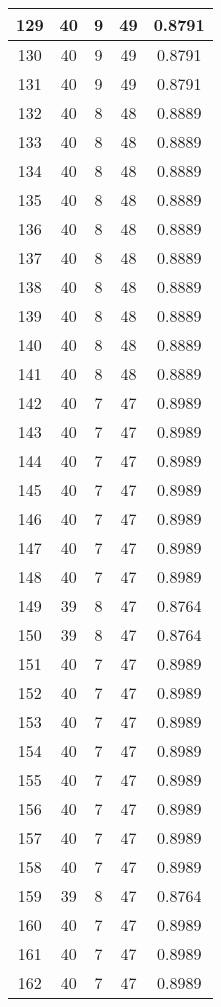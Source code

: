 \documentclass[letterpaper, 12pt]{article}
\begin{document}
\begin{longtable}{|c|c|c|c|c|}
\hline
129 & 40 & 9 & 49 & 0.8791 \\
\hline
130 & 40 & 9 & 49 & 0.8791 \\
\hline
131 & 40 & 9 & 49 & 0.8791 \\
\hline
132 & 40 & 8 & 48 & 0.8889 \\
\hline
133 & 40 & 8 & 48 & 0.8889 \\
\hline
134 & 40 & 8 & 48 & 0.8889 \\
\hline
135 & 40 & 8 & 48 & 0.8889 \\
\hline
136 & 40 & 8 & 48 & 0.8889 \\
\hline
137 & 40 & 8 & 48 & 0.8889 \\
\hline
138 & 40 & 8 & 48 & 0.8889 \\
\hline
139 & 40 & 8 & 48 & 0.8889 \\
\hline
140 & 40 & 8 & 48 & 0.8889 \\
\hline
141 & 40 & 8 & 48 & 0.8889 \\
\hline
142 & 40 & 7 & 47 & 0.8989 \\
\hline
143 & 40 & 7 & 47 & 0.8989 \\
\hline
144 & 40 & 7 & 47 & 0.8989 \\
\hline
145 & 40 & 7 & 47 & 0.8989 \\
\hline
146 & 40 & 7 & 47 & 0.8989 \\
\hline
147 & 40 & 7 & 47 & 0.8989 \\
\hline
148 & 40 & 7 & 47 & 0.8989 \\
\hline
149 & 39 & 8 & 47 & 0.8764 \\
\hline
150 & 39 & 8 & 47 & 0.8764 \\
\hline
151 & 40 & 7 & 47 & 0.8989 \\
\hline
152 & 40 & 7 & 47 & 0.8989 \\
\hline
153 & 40 & 7 & 47 & 0.8989 \\
\hline
154 & 40 & 7 & 47 & 0.8989 \\
\hline
155 & 40 & 7 & 47 & 0.8989 \\
\hline
156 & 40 & 7 & 47 & 0.8989 \\
\hline
157 & 40 & 7 & 47 & 0.8989 \\
\hline
158 & 40 & 7 & 47 & 0.8989 \\
\hline
159 & 39 & 8 & 47 & 0.8764 \\
\hline
160 & 40 & 7 & 47 & 0.8989 \\
\hline
161 & 40 & 7 & 47 & 0.8989 \\
\hline
162 & 40 & 7 & 47 & 0.8989 \\

\end{longtable}
\end{document}
